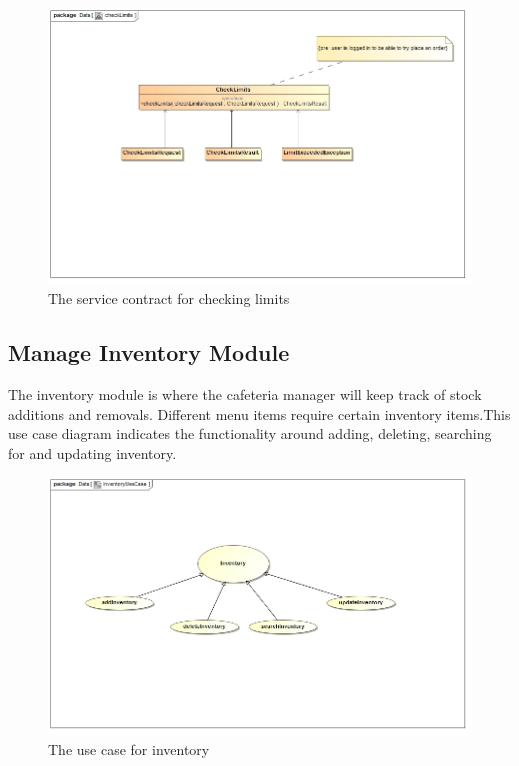 \documentclass[a4paper,12pt]{article}
\begin{document}
\begin{figure}[H]
	\centering
	\includegraphics[width=1.0\textwidth]{../images/checkLimitsSC.jpg}
	\caption{The service contract for checking limits}
\end{figure}

\subsection{Manage Inventory Module}

The inventory module is where the cafeteria manager will keep track of stock additions and removals. Different menu items require certain inventory items.This use case diagram indicates the functionality around adding, deleting, searching for and updating inventory.

\begin{figure}[H]
  \centering
    \includegraphics[width=1.0\textwidth]{../images/InventoryUseCase.jpg}
    \caption{The use case for inventory} 
\end{figure}
\end{document}
